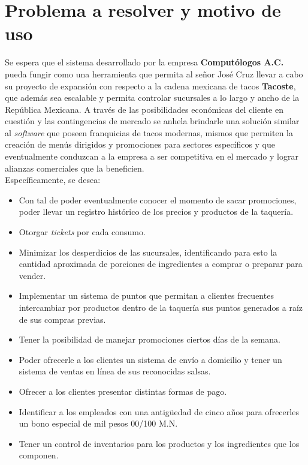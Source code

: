 \documentclass[11pt,letterpaper]{article}
\begin{document}
\section{Problema a resolver y motivo de uso}

Se espera que el sistema desarrollado por la empresa \textbf{Computólogos A.C.} pueda fungir como una herramienta que permita al señor José Cruz llevar a cabo su proyecto de expansión con respecto a la cadena mexicana de tacos \textbf{Tacoste}, que además sea escalable y permita controlar sucursales a lo largo y ancho de la República Mexicana. A través de las posibilidades económicas del cliente en cuestión y las contingencias de mercado se anhela brindarle una solución similar al \textit{software} que poseen franquicias de tacos modernas, mismos que permiten la creación de menús dirigidos y promociones para sectores específicos y que eventualmente conduzcan a la empresa a ser competitiva en el mercado y lograr alianzas comerciales que la beneficien. \\

Específicamente, se desea:

\begin{itemize}
\item Con tal de poder eventualmente conocer el momento de sacar promociones, poder llevar un registro histórico de los precios y productos de la taquería. 
\item Otorgar \textit{tickets} por cada consumo.
\item Minimizar los desperdicios de las sucursales, identificando para esto la cantidad aproximada de porciones de ingredientes a comprar o preparar para vender.
\item Implementar un sistema de puntos que permitan a clientes frecuentes intercambiar por productos dentro de la taquería sus puntos generados a raíz de sus compras previas.
\item Tener la posibilidad de manejar promociones ciertos días de la semana. 
\item Poder ofrecerle a los clientes un sistema de envío a domicilio y tener un sistema de ventas en línea de sus reconocidas salsas.
\item Ofrecer a los clientes presentar distintas formas de pago.
\item Identificar a los empleados con una antigüedad de cinco años para ofrecerles un bono especial de mil pesos 00/100 M.N.
\item Tener un control de inventarios para los productos y los ingredientes que los componen.
\end{itemize} 
\end{document}
